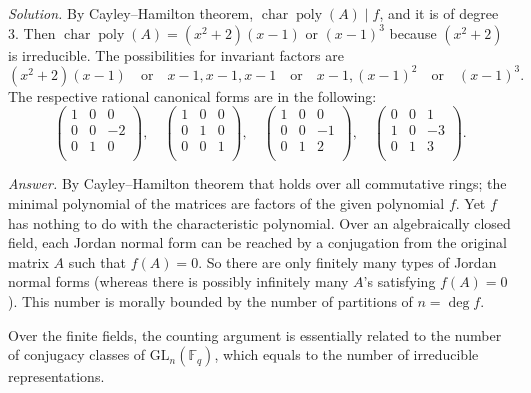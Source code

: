 \documentclass{mathproblems}
\newcommand\F{\mathbb{F}}
\newcommand\GL{\mathrm{GL}}
\begin{document}
\begin{questions}
\textit{Solution.} By Cayley--Hamilton theorem, $\operatorname{char}\operatorname{poly}(A)\mid f$, and it is of degree 3. Then $\operatorname{char}\operatorname{poly}(A)=(x^2+2)(x-1)$ or $(x - 1)^3$ because $(x^2+2)$ is irreducible. The possibilities for invariant factors are 
$$
(x^2+2)(x-1)\quad \text{or}\quad x-1,x-1,x-1\quad \text{or}\quad x-1,(x-1)^2\quad \text{or}\quad (x-1)^3.
$$ The respective rational canonical forms are in the following:
$$
\begin{pmatrix}
    1 & 0 & 0\\
    0 & 0 & -2\\
    0 & 1 & 0\\
\end{pmatrix}, \quad
\begin{pmatrix}
    1 & 0 & 0\\
    0 & 1 & 0\\
    0 & 0 & 1\\
\end{pmatrix}, \quad
\begin{pmatrix}
    1 & 0 & 0\\
    0 & 0 & -1\\
    0 & 1 & 2\\
\end{pmatrix}, \quad
\begin{pmatrix}
    0 & 0 & 1\\
    1 & 0 & -3\\
    0 & 1 & 3\\
\end{pmatrix}.
$$


\textit{Answer.} By Cayley--Hamilton theorem that holds over all commutative rings; the minimal polynomial of the matrices are factors of the given polynomial $f$. Yet $f$ has nothing to do with the characteristic polynomial. Over an algebraically closed field, each Jordan normal form can be reached by a conjugation from the original matrix $A$ such that $f(A)=0$. So there are only finitely many types of Jordan normal forms (whereas there is possibly infinitely many $A$'s satisfying $f(A)=0$). This number is morally bounded by the number of partitions of $n=\deg f$.

Over the finite fields, the counting argument is essentially related to the number of conjugacy classes of $\GL_n(\F_q)$, which equals to the number of irreducible representations. 



\end{questions}
\end{document}
